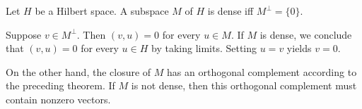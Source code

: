 \begin{Corollary}
\label{cor:hilbert-density-orthogonal-complement}
Let $H$ be a Hilbert space. A subspace $M$ of $H$ is dense iff $M^\perp=\{0\}$.
\end{Corollary}

\begin{Proof}
Suppose $v\in M^\perp$. Then $(v,u)=0$ for every $u\in M$. If $M$ is dense, we conclude that $(v,u)=0$ for every $u\in H$ by taking limits. Setting $u=v$ yields $v=0$.

On the other hand, the closure of $M$ has an orthogonal complement according to the preceding theorem. If $M$ is not dense, then this orthogonal complement must contain nonzero vectors.
\end{Proof}
